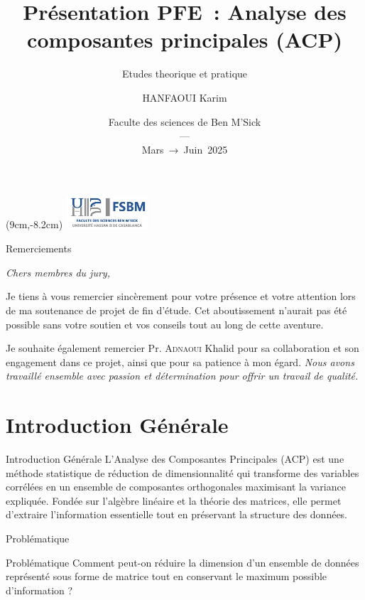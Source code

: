 \documentclass{beamer}
\title[Rapport Projet]{Présentation PFE : Analyse des composantes principales (ACP)}
\subtitle{Etudes theorique et pratique}
\author[HANFAOUI K. ]{HANFAOUI Karim\inst{1}}
\institute[FSBM]{\inst{1} FSBM — 3ᵉ année Licence SMA \\ \texttt{karim.hanfaoui-etu@etu.univh2c.ma} \\[2pt]}
\date[JUIN 2025]{Faculte des sciences de Ben M'Sick \\ — \\ Mars → Juin 2025}
\begin{document}
\begin{frame}
  \titlepage
  \begin{textblock*}{8cm}(9cm,-8.2cm)
    \includegraphics[height=1.2cm]{logo-fsbVF}
  \end{textblock*}
\end{frame}

\begin{frame}{Remerciements}
\begin{center}\textit{Chers membres du jury,}\end{center}

Je tiens à vous remercier sincèrement pour votre présence et votre attention lors de ma soutenance de projet de fin d’étude. Cet aboutissement n’aurait pas été possible sans votre soutien et vos conseils tout au long de cette aventure.

\vspace{0.2cm}

Je souhaite également remercier Pr. \textsc{Adnaoui} Khalid pour sa collaboration et son engagement dans ce projet, ainsi que pour sa patience à mon égard. \textit{Nous avons travaillé ensemble avec passion et détermination pour offrir un travail de qualité.}
\end{frame}

\section{Introduction Générale}

\begin{frame}{Introduction Générale}
L'Analyse des Composantes Principales (ACP) est une méthode statistique de réduction de dimensionnalité qui transforme des variables corrélées en un ensemble de composantes orthogonales maximisant la variance expliquée. Fondée sur l'algèbre linéaire et la théorie des matrices, elle permet d'extraire l'information essentielle tout en préservant la structure des données.
\end{frame}

\begin{frame}{Problématique}
  \begin{alertblock}{Problématique}
    Comment peut-on réduire la dimension d’un ensemble de données représenté sous forme de matrice tout en conservant le maximum possible d’information ?
  \end{alertblock}
\end{frame}
\end{document}
